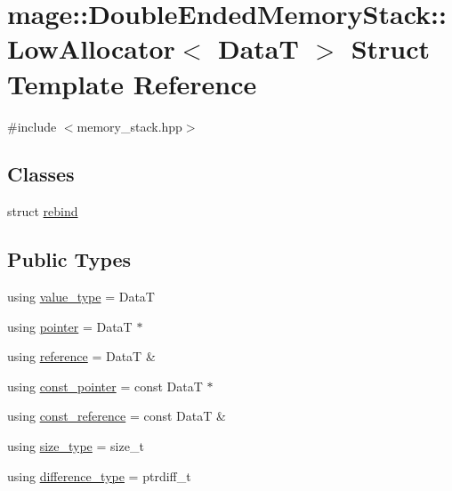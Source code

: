 \hypertarget{structmage_1_1_double_ended_memory_stack_1_1_low_allocator}{}\section{mage\+:\+:Double\+Ended\+Memory\+Stack\+:\+:Low\+Allocator$<$ DataT $>$ Struct Template Reference}
\label{structmage_1_1_double_ended_memory_stack_1_1_low_allocator}


{\ttfamily \#include $<$memory\+\_\+stack.\+hpp$>$}

\subsection*{Classes}
\begin{DoxyCompactItemize}
\item 
struct \hyperlink{structmage_1_1_double_ended_memory_stack_1_1_low_allocator_1_1rebind}{rebind}
\end{DoxyCompactItemize}
\subsection*{Public Types}
\begin{DoxyCompactItemize}
\item 
using \hyperlink{structmage_1_1_double_ended_memory_stack_1_1_low_allocator_a76b57f9b67a84b4e09def8ce54451acb}{value\+\_\+type} = DataT
\item 
using \hyperlink{structmage_1_1_double_ended_memory_stack_1_1_low_allocator_a1b1b80faf9e5a34f5ee35979a78f68a7}{pointer} = DataT $\ast$
\item 
using \hyperlink{structmage_1_1_double_ended_memory_stack_1_1_low_allocator_a0d6e290bc4fa4cc0d8595a8eadf21508}{reference} = DataT \&
\item 
using \hyperlink{structmage_1_1_double_ended_memory_stack_1_1_low_allocator_a5c3c7e9fde98e421a2f22d6b7cfbc83e}{const\+\_\+pointer} = const DataT $\ast$
\item 
using \hyperlink{structmage_1_1_double_ended_memory_stack_1_1_low_allocator_a08f0e62b93ff0007afdf1ee565fcd490}{const\+\_\+reference} = const DataT \&
\item 
using \hyperlink{structmage_1_1_double_ended_memory_stack_1_1_low_allocator_ad59f0cf4da8f47289493179d9236e342}{size\+\_\+type} = size\+\_\+t
\item 
using \hyperlink{structmage_1_1_double_ended_memory_stack_1_1_low_allocator_a146f18c8e4654d7c3462c49aa87b509a}{difference\+\_\+type} = ptrdiff\+\_\+t
\end{DoxyCompactItemize}

